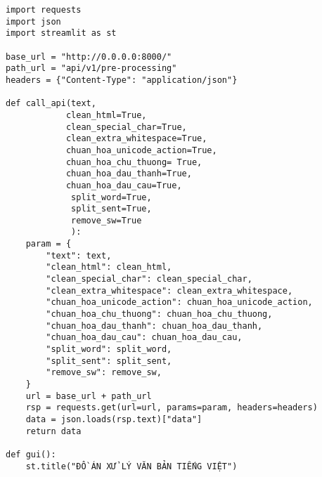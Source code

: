 \begin{verbatim}
import requests
import json
import streamlit as st

base_url = "http://0.0.0.0:8000/"
path_url = "api/v1/pre-processing"
headers = {"Content-Type": "application/json"}

def call_api(text,
            clean_html=True,
            clean_special_char=True,
            clean_extra_whitespace=True,
            chuan_hoa_unicode_action=True,
            chuan_hoa_chu_thuong= True,
            chuan_hoa_dau_thanh=True,
            chuan_hoa_dau_cau=True,
             split_word=True,
             split_sent=True,
             remove_sw=True
             ):
    param = {
        "text": text,
        "clean_html": clean_html,
        "clean_special_char": clean_special_char,
        "clean_extra_whitespace": clean_extra_whitespace,
        "chuan_hoa_unicode_action": chuan_hoa_unicode_action,
        "chuan_hoa_chu_thuong": chuan_hoa_chu_thuong,
        "chuan_hoa_dau_thanh": chuan_hoa_dau_thanh,
        "chuan_hoa_dau_cau": chuan_hoa_dau_cau,
        "split_word": split_word,
        "split_sent": split_sent,
        "remove_sw": remove_sw,
    }
    url = base_url + path_url
    rsp = requests.get(url=url, params=param, headers=headers)
    data = json.loads(rsp.text)["data"]
    return data

def gui():
    st.title("ĐỒ ÁN XỬ LÝ VĂN BẢN TIẾNG VIỆT")


\end{verbatim}
